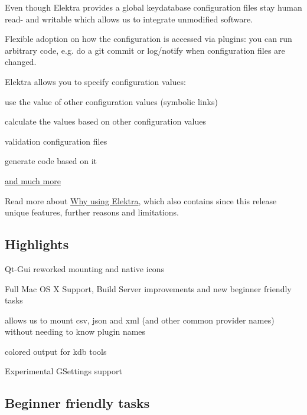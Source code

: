 \begin{DoxyEnumerate}
\item Even though Elektra provides a global keydatabase configuration files stay human read-\/ and writable which allows us to integrate unmodified software.
\item Flexible adoption on how the configuration is accessed via plugins\+: you can run arbitrary code, e.\+g. do a {\ttfamily git commit} or log/notify when configuration files are changed.
\item Elektra allows you to specify configuration values\+:
\begin{DoxyItemize}
\item use the value of other configuration values (symbolic links)
\item calculate the values based on other configuration values
\item validation configuration files
\item generate code based on it
\item \hyperlink{md_src_plugins_README_src_plugins_README_md}{and much more}
\end{DoxyItemize}
\end{DoxyEnumerate}

Read more about \hyperlink{doc_WHY_md}{Why using Elektra}, which also contains since this release unique features, further reasons and limitations.

\subsection*{Highlights}


\begin{DoxyItemize}
\item Qt-\/\+Gui reworked mounting and native icons
\item Full Mac O\+S X Support, Build Server improvements and new beginner friendly tasks
\item allows us to mount csv, json and xml (and other common provider names) without needing to know plugin names
\item colored output for kdb tools
\item Experimental G\+Settings support
\end{DoxyItemize}

\subsection*{Beginner friendly tasks}

